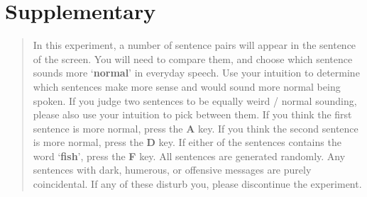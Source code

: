\documentclass[a4paper,10pt,twoside]{article}
\begin{document}












\section*{Supplementary}

\begin{quote}
In this experiment, a number of sentence pairs will appear in the
sentence of the screen. You will need to compare them, and choose
which sentence sounds more \lq{}\textbf{normal}\rq{} in everyday
speech. Use your intuition to determine which sentences make more
sense and would sound more normal being spoken. If you judge two
sentences to be equally weird / normal sounding, please also use your
intuition to pick between them. If you think the first sentence is
more normal, press the \textbf{A} key. If you think the second
sentence is more normal, press the \textbf{D} key. If either of the
sentences contains the word \lq{}\textbf{fish}\rq{}, press the
\textbf{F} key. All sentences are generated randomly. Any sentences
with dark, humerous, or offensive messages are purely coincidental. If
any of these disturb you, please discontinue the experiment.
\end{quote}
\end{document}
